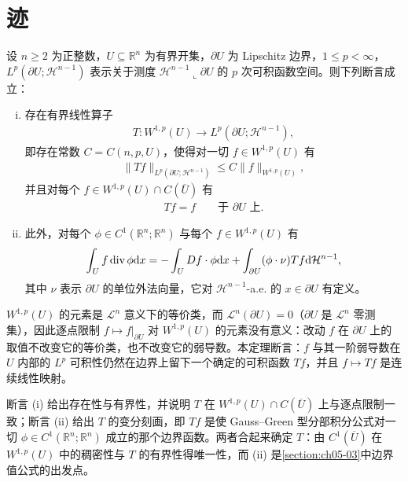 \documentclass[../../main.tex]{subfiles}%
\begin{document}
\section{迹}\label{section:ch04-03}

\begin{theorem}\label{theorem:ch04-4-6}
设 $n\geqslant2$ 为正整数，$U\subseteq\mathbb{R}^n$ 为有界开集，$\partial U$ 为 Lipschitz 边界，$1\leqslant p<\infty$，$L^p(\partial U;\mathcal{H}^{n-1})$ 表示关于测度 $\mathcal{H}^{n-1}\llcorner\partial U$ 的 $p$ 次可积函数空间。则下列断言成立：
\begin{enumerate}[(i)]
\item 存在有界线性算子
\begin{align*}
T:W^{1,p}(U)\to L^p(\partial U;\mathcal{H}^{n-1}),
\end{align*}
即存在常数 $C=C(n,p,U)$，使得对一切 $f\in W^{1,p}(U)$ 有
\begin{align*}
\lVert Tf\rVert_{L^p(\partial U;\mathcal{H}^{n-1})}\leqslant C\lVert f\rVert_{W^{1,p}(U)},
\end{align*}
并且对每个 $f\in W^{1,p}(U)\cap C(\overline{U})$ 有
\begin{align*}
Tf=f\qquad\text{于 }\partial U\text{ 上}.
\end{align*}
\item 此外，对每个 $\phi\in C^1(\mathbb{R}^n;\mathbb{R}^n)$ 与每个 $f\in W^{1,p}(U)$ 有
\begin{align*}
\int_U f\operatorname{div}\phi\mathrm{d} x=-\int_U Df\cdot\phi\mathrm{d} x+\int_{\partial U}(\phi\cdot\nu)Tf\mathrm{d}\mathcal{H}^{n-1},
\end{align*}
其中 $\nu$ 表示 $\partial U$ 的单位外法向量，它对 $\mathcal{H}^{n-1}$-a.e. 的 $x\in\partial U$ 有定义。
\end{enumerate}
\end{theorem}

\begin{remark}\label{remark:ch04-thm-4-6-动机}
$W^{1,p}(U)$ 的元素是 $\mathcal{L}^n$ 意义下的等价类，而 $\mathcal{L}^n(\partial U)=0$（$\partial U$ 是 $\mathcal{L}^n$ 零测集），因此逐点限制 $f\mapsto f|_{\partial U}$ 对 $W^{1,p}(U)$ 的元素没有意义：改动 $f$ 在 $\partial U$ 上的取值不改变它的等价类，也不改变它的弱导数。本定理断言：$f$ 与其一阶弱导数在 $U$ 内部的 $L^p$ 可积性仍然在边界上留下一个确定的可积函数 $Tf$，并且 $f\mapsto Tf$ 是连续线性映射。

断言 (i) 给出存在性与有界性，并说明 $T$ 在 $W^{1,p}(U)\cap C(\overline{U})$ 上与逐点限制一致；断言 (ii) 给出 $T$ 的变分刻画，即 $Tf$ 是使 Gauss--Green 型分部积分公式对一切 $\phi\in C^1(\mathbb{R}^n;\mathbb{R}^n)$ 成立的那个边界函数。两者合起来确定 $T$：由 $C^1(\overline{U})$ 在 $W^{1,p}(U)$ 中的稠密性与 $T$ 的有界性得唯一性，而 (ii) 是\cref{section:ch05-03}中边界值公式的出发点。%
\end{remark}
\end{document}
